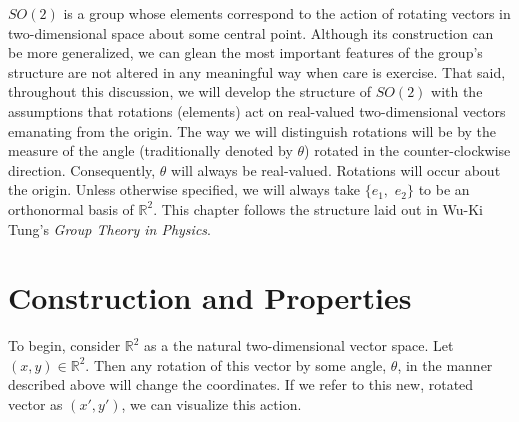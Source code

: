 \documentclass[10pt]{ucthesis}
\newcommand{\R}{\mathbb{R}}
\begin{document}
$SO(2)$ is a group whose elements correspond to the action of rotating vectors in two-dimensional space about some central point. Although its construction can be more generalized, we can glean the most important features of the group's structure are not altered in any meaningful way when care is exercise. That said, throughout this discussion, we will develop the structure of $SO(2)$ with the assumptions that rotations (elements) act on real-valued two-dimensional vectors emanating from the origin. The way we will distinguish rotations will be by the measure of the angle (traditionally denoted by $\theta$) rotated in the counter-clockwise direction. Consequently, $\theta$ will always be real-valued. Rotations will occur about the origin. Unless otherwise specified, we will always take $\{e_1,$ $e_2\}$ to be an orthonormal basis of $\R^2$. This chapter follows the structure laid out in Wu-Ki Tung's \textit{Group Theory in Physics}.\cite{Tung}

\section{Construction and Properties}

To begin, consider $\R^2$ as a the natural two-dimensional vector space. Let $(x,y)\in\R^2$. Then any rotation of this vector by some angle, $\theta$, in the manner described above will change the coordinates. If we refer to this new, rotated vector as $(x',y')$, we can visualize this action.

\begin{center}
    \end{center}
\end{document}
